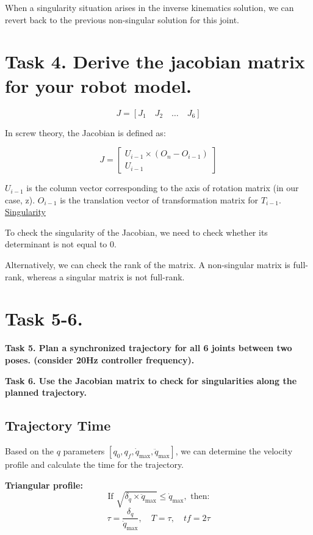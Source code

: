 \documentclass{article}
\begin{document}
When a singularity situation arises in the inverse kinematics solution, 
we can revert back to the previous non-singular solution for this joint.

\section{Task 4. Derive the jacobian matrix for your robot model.}

\[ J = [J_1 \quad J_2 \quad \ldots \quad J_6] \]

In screw theory, the Jacobian is defined as:

\[ J = \begin{bmatrix}
    U_{i-1} \times (O_n - O_{i-1}) \\
    U_{i-1}
\end{bmatrix} \]

    
$U_{i-1}$ is the column vector corresponding to the axis of rotation matrix (in our case, z). 
$O_{i-1}$ is the translation vector of transformation matrix for $T_{i-1}$. \\

\underline{Singularity}

To check the singularity of the Jacobian, we need to check whether its determinant is not 
equal to 0. 

Alternatively, we can check the rank of the matrix. A non-singular matrix is full-rank, whereas a singular matrix is not full-rank.

\section{Task 5-6.}
\textbf{Task 5. Plan a synchronized trajectory for all 6 joints between two poses. (consider 20Hz
controller frequency).\\}

\textbf{Task 6. Use the Jacobian matrix to check for singularities along the planned trajectory.}

\subsection{Trajectory Time}
Based on the $q$ parameters $[q_0, q_f, \dot{q}_{\text{max}}, \ddot{q}_{\text{max}}]$, we can determine the velocity profile and calculate the time for the trajectory.

\textbf{Triangular profile:}
\[
\text{If } \sqrt{\delta_q \times \ddot{q}_{\text{max}}} \leq \dot{q}_{\text{max}}, \text{ then:}
\]
\[
\tau = \frac{\delta_q}{\dot{q}_{\text{max}}}, \quad T = \tau, \quad tf = 2\tau
\]
\end{document}
